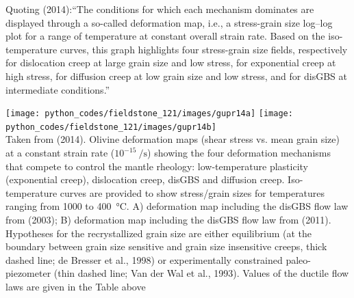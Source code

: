 

Quoting \textcite{gupr14} (2014):``The conditions for
which each mechanism dominates are displayed through a so-called deformation map, 
i.e., a stress-grain size log–log plot for a range of temperature at constant overall strain rate. 
Based on the iso-temperature
curves, this graph highlights four stress-grain size fields, respectively
for dislocation creep at large grain size and low stress, for exponential
creep at high stress, for diffusion creep at low grain size and low stress,
and for disGBS at intermediate conditions.''

\begin{center}
\texttt{[image: python\_codes/fieldstone\_121/images/gupr14a]}
\texttt{[image: python\_codes/fieldstone\_121/images/gupr14b]}\\
{\captionfont Taken from \textcite{gupr14} (2014). Olivine deformation maps 
(shear stress vs. mean grain size) at a constant strain rate ($10^{-15}~\si{\per\second}$) 
showing the four deformation mechanisms that compete to control the mantle rheology: 
low-temperature plasticity (exponential creep), dislocation creep, disGBS
and diffusion creep. Iso-temperature curves are provided to show stress/grain sizes for
temperatures ranging from 1000 to 400~\si{\celsius}. 
A) deformation map including the disGBS
flow law from \textcite{hiko03} (2003); 
B) deformation map including the disGBS flow law from \textcite{hazk11} (2011). 
Hypotheses for the recrystallized grain size are either
equilibrium (at the boundary between grain size sensitive and grain size insensitive
creeps, thick dashed line; de Bresser et al., 1998) or experimentally constrained paleo-
piezometer (thin dashed line; Van der Wal et al., 1993). Values of the ductile flow laws
are given in the Table above}
\end{center}


